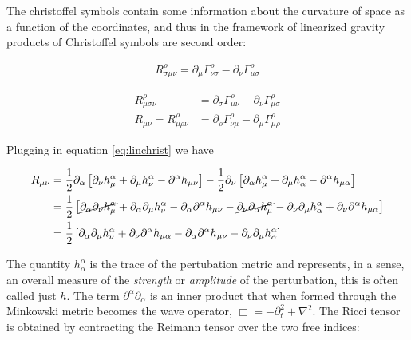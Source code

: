 The christoffel symbols contain some information about the curvature of space as a function of the coordinates, and thus in the framework of linearized gravity products of Christoffel symbols are second order:   

\begin{align}
R^{\rho}_{\sigma \mu \nu} = \partial_{\mu}\Gamma^{\rho}_{\nu \sigma} - \partial_{\nu}\Gamma^{\rho}_{\mu \sigma} 
\end{align}

\begin{align}
R^{\rho}_{\mu \sigma \nu} &= \partial_{\sigma}\Gamma^{\rho}_{\mu \nu} - \partial_{\nu}\Gamma^{\rho}_{\mu \sigma} \\
R_{\mu \nu} = R^{\rho}_{\mu \rho \nu} &= \partial_{\rho}\Gamma^{\rho}_{\nu \mu} - \partial_{\mu}\Gamma^{\rho}_{\mu \rho}
\end{align}

Plugging in equation \ref{eq:linchrist} we have

\begin{align}
R_{\mu \nu} & = \frac{1}{2}\partial_{\alpha}\left[\partial_{\nu}h^{\alpha}_{\mu} + \partial_{\mu}h^{\alpha}_{\nu} - \partial^{\alpha}h_{\mu \nu}\right] - \frac{1}{2}\partial_{\nu}\left[\partial_{\alpha}h^{\alpha}_{\mu} + \partial_{\mu}h^{\alpha}_{\alpha} - \partial^{\alpha}h_{\mu \alpha}\right] \\
&= \frac{1}{2}\left[ \cancel{\partial_{\alpha}\partial_{\nu}h^{\alpha}_{\mu}} + \partial_{\alpha}\partial_{\mu}h^{\alpha}_{\nu} - \partial_{\alpha}\partial^{\alpha}h_{\mu \nu} - \cancel{\partial_{\nu}\partial_{\alpha}h^{\alpha}_{\mu}} - \partial_{\nu}\partial_{\mu}h^{\alpha}_{\alpha} + \partial_{\nu}\partial^{\alpha}h_{\mu \alpha} \right] \\
&= \frac{1}{2}\left[\partial_{\alpha}\partial_{\mu}h^{\alpha}_{\nu} + \partial_{\nu}\partial^{\alpha}h_{\mu \alpha} - \partial_{\alpha}\partial^{\alpha}h_{\mu \nu} - \partial_{\nu}\partial_{\mu}h^{\alpha}_{\alpha}\right]\label{eq:linricci}
\end{align}

The quantity $h^{\alpha}_{\alpha}$ is the trace of the pertubation metric and represents, in a sense, an overall measure of the \textit{strength} or \textit{amplitude} of the perturbation, this is often called just $h$. The term $\partial^{\alpha}\partial_{\alpha}$ is an inner product that when formed through the Minkowski metric becomes the wave operator, $\Box = -\partial_{t}^{2} + \nabla^2$. The Ricci tensor is obtained by contracting the Reimann tensor over the two free indices:

